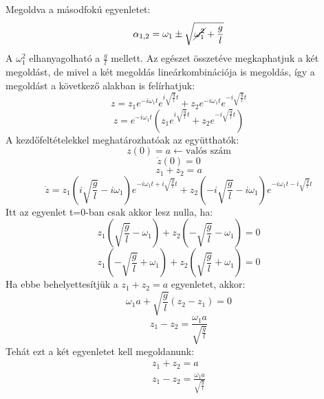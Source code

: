 \documentclass[a4paper,12pt]{article}
\begin{document}
Megoldva a másodfokú egyenletet:
 \begin{equation}
    \alpha_{1,2} = \omega_1 \pm \sqrt{\cancel{\omega_1^2} + \frac{g}{l}}
 \end{equation}
A $\omega_1^2$ elhanyagolható a $\frac{g}{l}$ mellett. Az egészet összetéve megkaphatjuk a két megoldást, de mivel a két megoldás lineárkombinációja is megoldás, így a megoldást a következő alakban is felírhatjuk:
\begin{equation}
    z = z_1 e^{-i\omega_1 t} e^{i\sqrt{\frac{g}{l}}t} + z_2 e^{-i\omega_1 t} e^{-i\sqrt{\frac{g}{l}}t} 
\end{equation}
\begin{equation}
    z = e^{-i\omega_1 t} \left(z_1 e^{i\sqrt{\frac{g}{l}}t} + z_2 e^{-i\sqrt{\frac{g}{l}}t}\right)
\end{equation}
A kezdőfeltételekkel meghatározhatóak az együtthatók:
\begin{equation}
    z(0) = a \leftarrow \text{valós szám}
\end{equation}
\begin{equation}
    \dot{z}(0) = 0
\end{equation}
\begin{equation}
    z_1 + z_2 = a
\end{equation}
\begin{equation}
    \dot{z} = z_1 \left(i\sqrt{\frac{g}{l}} - i\omega_1\right) e^{-i\omega_1t + i\sqrt{\frac{g}{l}}t} + z_2 \left(-i\sqrt{\frac{g}{l}} - i\omega_1\right) e^{-i\omega_1t - i\sqrt{\frac{g}{l}}t}
\end{equation}
Itt az egyenlet t=0-ban csak akkor lesz nulla, ha:
\begin{equation}
    z_1 \left(\sqrt{\frac{g}{l}} - \omega_1\right) + z_2 \left(-\sqrt{\frac{g}{l}} - \omega_1\right) = 0
\end{equation}
\begin{equation}
    z_1 \left(-\sqrt{\frac{g}{l}} + \omega_1\right) + z_2 \left(\sqrt{\frac{g}{l}} + \omega_1\right) = 0
\end{equation}
Ha ebbe behelyettesítjük a $z_1 + z_2 = a$ egyenletet, akkor:
\begin{equation}
    \omega_1 a + \sqrt{\frac{g}{l}}(z_2 - z_1) = 0
\end{equation}
\begin{equation}
    z_1 - z_2 = \frac{\omega_1 a}{\sqrt{\frac{g}{l}}}
\end{equation}
Tehát ezt a két egyenletet kell megoldanunk:
\begin{gather}
    z_1 + z_2 = a \\
    z_1 - z_2 = \frac{\omega_1 a}{\sqrt{\frac{g}{l}}}
\end{gather}
\end{document}
